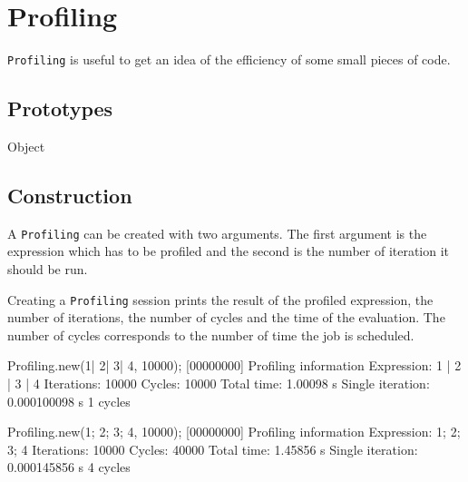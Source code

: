 
\section{Profiling}

\lstinline|Profiling| is useful to get an idea of the efficiency of some
small pieces of code.

\subsection{Prototypes}

\begin{refObjects}
\item[Object]
\end{refObjects}

\subsection{Construction}

A \lstinline|Profiling| can be created with two arguments.  The first
argument is the expression which has to be profiled and the second is the
number of iteration it should be run.

Creating a \lstinline|Profiling| session prints the result of the profiled
expression, the number of iterations, the number of cycles and the time of
the evaluation.  The number of cycles corresponds to the number of time the
job is scheduled.

\begin{urbiunchecked}[firstnumber=1]
Profiling.new({1| 2| 3| 4}, 10000);
[00000000] Profiling information
  Expression:       1 | 2 | 3 | 4
  Iterations:       10000
  Cycles:           10000
  Total time:       1.00098 s
  Single iteration: 0.000100098 s
                    1 cycles


Profiling.new({1; 2; 3; 4}, 10000);
[00000000] Profiling information
  Expression:       1;
2;
3;
4
  Iterations:       10000
  Cycles:           40000
  Total time:       1.45856 s
  Single iteration: 0.000145856 s
                    4 cycles
\end{urbiunchecked}


